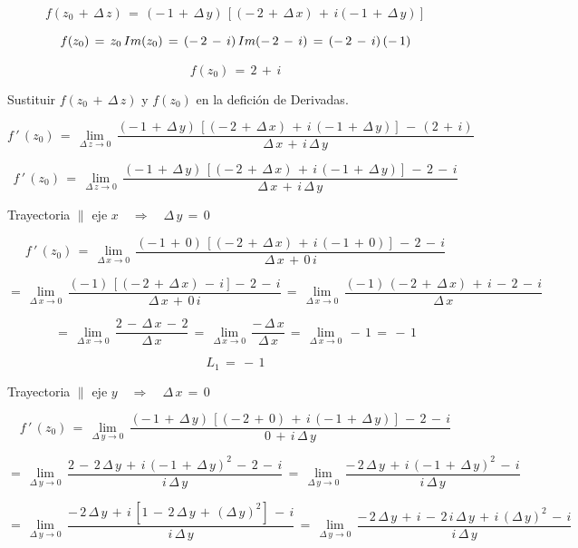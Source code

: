 \documentclass[a4paper,11pt,openany]{book}
\begin{document}
$$f(z_{0}\,+\,\Delta\,z)\,=\,(-\,1\,+\,\Delta\,y)\,\left[(-\,2\,+\,\Delta\,x)\,+\,i(-\,1\,+\,\Delta\,y)\right]$$

$$f(z_{0})\,=\,z_{0}\,\mathnormal{Im}(z_{0})\,=\,(-\,2\,-\,i)\,\mathnormal{Im}(-\,2\,-\,i)\,=\,(-\,2\,-\,i)\,(-\,1)$$

$$f(z_{0})\,=\,2\,+\,i$$

\textcolor{ao(english)}{} Sustituir  $f(z_{0}\,+\,\Delta\,z)$ y $f(z_{0})$ en la defición de Derivadas.

$$f\,'\,(z_{0})\,=\,\displaystyle\lim_{\Delta\,z \to 0}\,\dfrac{(-\,1\,+\,\Delta\,y)\,\left[(-\,2\,+\,\Delta\,x)\,+\,i\,(-\,1\,+\,\Delta\,y)\right]\,-\,(2\,+\,i)}{\Delta\,x\,+\,i\,\Delta\,y}$$

$$f\,'\,(z_{0})\,=\,\displaystyle\lim_{\Delta\,z \to 0}\,\dfrac{(-\,1\,+\,\Delta\,y)\,\left[(-\,2\,+\,\Delta\,x)\,+\,i\,(-\,1\,+\,\Delta\,y)\right]\,-\,2\,-\,i}{\Delta\,x\,+\,i\,\Delta\,y}$$

\textcolor{ao(english)}{} Trayectoria $\parallel$ eje $x \quad\Rightarrow\quad \Delta\,y\,=\,0$

$$f\,'\,(z_{0})\,=\,\displaystyle\lim_{\Delta\,x \to 0}\,\dfrac{(-\,1\,+\,0)\,\left[(-\,2\,+\,\Delta\,x)\,+\,i\,(-\,1\,+\,0)\right]\,-\,2\,-\,i}{\Delta\,x\,+\,0\,i}$$

$$=\,\displaystyle\lim_{\Delta\,x \to 0}\,\dfrac{(-\,1)\,\left[(-\,2\,+\,\Delta\,x)\,-\,i\right]-\,2\,-\,i}{\Delta\,x\,+\,0\,i}\,=\,\displaystyle\lim_{\Delta\,x \to 0}\,\dfrac{(-\,1)\,(-\,2\,+\,\Delta\,x)\,+\,i\,-\,2\,-\,i}{\Delta\,x}$$

$$=\,\displaystyle\lim_{\Delta\,x \to 0}\,\dfrac{2\,-\,\Delta\,x\,-\,2}{\Delta\,x}\,=\,\displaystyle\lim_{\Delta\,x \to 0}\,\dfrac{-\,\Delta\,x}{\Delta\,x}\,=\,\displaystyle\lim_{\Delta\,x \to 0}\,-\,1\,=\,-\,1$$

$$L_{1}\,=\,-\,1$$

\textcolor{ao(english)}{} Trayectoria $\parallel$ eje $y \quad\Rightarrow\quad \Delta\,x\,=\,0$

$$f\,'\,(z_{0})\,=\,\displaystyle\lim_{\Delta\,y \to 0}\,\dfrac{(-\,1\,+\,\Delta\,y)\,\left[(-\,2\,+\,0)\,+\,i\,(-\,1\,+\,\Delta\,y)\right]\,-\,2\,-\,i}{0\,+\,i\,\Delta\,y}$$

$$=\,\displaystyle\lim_{\Delta\,y \to 0}\,\dfrac{2\,-\,2\,\Delta\,y\,+\,i\,(-\,1\,+\,\Delta\,y)^{2}\,-\,2\,-\,i}{i\,\Delta\,y}\,=\,\displaystyle\lim_{\Delta\,y \to 0}\,\dfrac{-\,2\,\Delta\,y\,+\,i\,(-\,1\,+\,\Delta\,y)^{2}\,-\,i}{i\,\Delta\,y}$$

$$=\,\displaystyle\lim_{\Delta\,y \to 0}\,\dfrac{-\,2\,\Delta\,y\,+\,i\,[1\,-\,2\,\Delta\,y\,+\,(\Delta\,y)^{2}]\,-\,i}{i\,\Delta\,y}\,=\,\displaystyle\lim_{\Delta\,y \to 0}\,\dfrac{-\,2\,\Delta\,y\,+\,i\,-\,2\,i\,\Delta\,y\,+\,i\,(\Delta\,y)^{2}\,-\,i}{i\,\Delta\,y}$$
\end{document}
